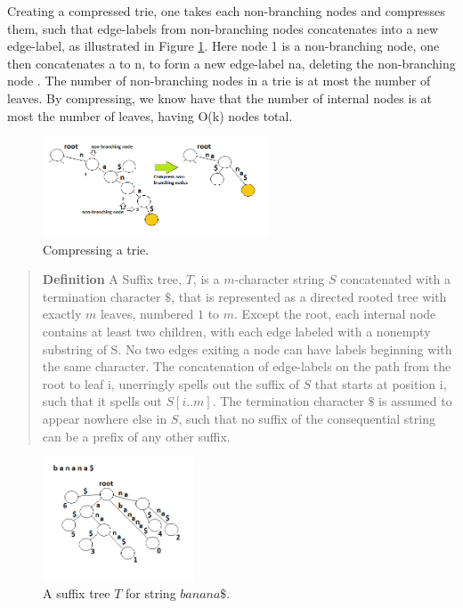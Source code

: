 \documentclass[12pt]{article} %
\begin{document}
\newline
Creating a compressed trie, one takes each non-branching nodes and compresses them, such that edge-labels from non-branching nodes concatenates into a new edge-label, as illustrated in Figure \ref{fig:comprestrie}. Here node 1 is a non-branching node, one then concatenates a to n, to form a new edge-label na, deleting the non-branching node \cite{mit}. The number of non-branching nodes in a trie is at most the number of leaves. By compressing, we know have that the number of internal nodes is at most the number of leaves, having O(k) nodes total.
\newline

\begin{figure}[h]
    \centering
    \includegraphics[width=0.6\textwidth]{compressingtrie}
    \captionsetup{width=0.8\textwidth}
    \caption{Compressing a trie.}
    \label{fig:comprestrie}
\end{figure}
\begin{quote}
\textbf{Definition}   A Suffix tree, $T$, is a $m$-character string $S$ concatenated with a termination character $\$$, that is represented as a directed rooted tree with exactly $m$ leaves, numbered $1$ to $m$. Except the root, each internal node contains at least two children, with each edge labeled with a nonempty substring of S. No two edges exiting a node can have labels beginning with the same character. The concatenation of edge-labels on the path from the root to leaf i, unerringly spells out the suffix of $S$ that starts at position i, such that it spells out $S[i..m]$. The termination character $\$$ is assumed to appear nowhere else in $S$, such that no suffix of the consequential string can be a prefix of any other suffix\cite{gusfield}.
\end{quote}
\begin{figure}[h]
    \centering
    \includegraphics[width=0.4\textwidth]{suffixtree(banana)}
    \captionsetup{width=0.8\textwidth}
    \caption{A suffix tree $T$ for string $banana\$$.}
    \label{fig:suffixTree}
\end{figure}
\end{document}
